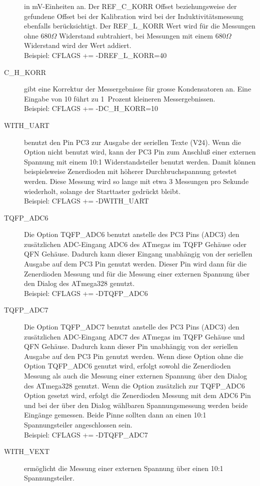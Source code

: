 \begin{description}
in mV-Einheiten an. Der REF\_C\_KORR Offset beziehungsweise der gefundene Offset bei der Kalibration
wird bei der Induktivitätsmessung ebenfalls berücksichtigt.
Der REF\_L\_KORR Wert wird für die Messungen ohne \(680 \Omega\) Widerstand subtrahiert, bei Messungen mit einem
\(680 \Omega\) Widerstand wird der Wert addiert.\\
Beispiel: CFLAGS += -DREF\_L\_KORR=40
  \item[C\_H\_KORR] gibt eine Korrektur der Messergebnisse für grosse Kondensatoren an.
Eine Eingabe von 10 führt zu 1~Prozent kleineren Messergebnissen.\\
Beispiel: CFLAGS += -DC\_H\_KORR=10
  \item[WITH\_UART] benutzt den Pin PC3 zur Ausgabe der seriellen Texte (V24). Wenn die Option nicht
benutzt wird, kann der PC3 Pin zum Anschluß einer externen Spannung mit einem 10:1 Widerstandsteiler benutzt
werden. Damit können beispielsweise Zenerdioden mit höherer Durchbruchspannung getestet werden.
Diese Messung wird so lange mit etwa 3 Messungen pro Sekunde wiederholt, solange der Starttaster gedrückt bleibt.\\
Beispiel: CFLAGS += -DWITH\_UART
  \item[TQFP\_ADC6] Die Option TQFP\_ADC6 benutzt anstelle des PC3 Pins (ADC3) den zusätzlichen ADC-Eingang ADC6
des ATmegas im TQFP Gehäuse oder QFN Gehäuse.
Dadurch kann dieser Eingang unabhängig von der seriellen Ausgabe auf dem PC3 Pin genutzt werden. Dieser Pin wird
dann für die Zenerdioden Messung und für die Messung einer externen Spannung über den Dialog des ATmega328 genutzt.\\
Beispiel: CFLAGS += -DTQFP\_ADC6
  \item[TQFP\_ADC7] Die Option TQFP\_ADC7 benutzt anstelle des PC3 Pins (ADC3) den zusätzlichen ADC-Eingang ADC7
des ATmegas im TQFP Gehäuse und QFN Gehäuse.
Dadurch kann dieser Pin unabhängig von der seriellen Ausgabe auf den PC3 Pin genutzt werden. Wenn diese Option 
ohne die Option TQFP\_ADC6 genutzt wird, erfolgt sowohl die Zenerdioden Messung als auch die Messung einer externen
Spannung über den Dialog des ATmega328 genutzt. Wenn die Option zusätzlich zur TQFP\_ADC6 Option gesetzt wird,
erfolgt die Zenerdioden Messung mit dem ADC6 Pin und bei der über den Dialog wählbaren Spannungsmessung werden
beide Eingänge gemessen. Beide Pinne sollten dann an einen 10:1 Spannungsteiler angeschlossen sein.\\
Beispiel: CFLAGS += -DTQFP\_ADC7
  \item[WITH\_VEXT] ermöglicht die Messung einer externen Spannung über einen 10:1 Spannungsteiler.

\end{description}
